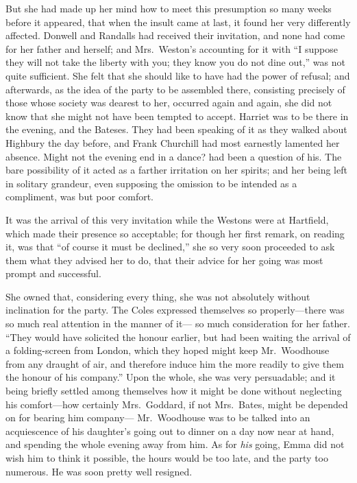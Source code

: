 But she had made up her mind how to meet this presumption so many
weeks before it appeared, that when the insult came at last,
it found her very differently affected.  Donwell and Randalls
had received their invitation, and none had come for her father
and herself; and Mrs.\ Weston's accounting for it with ``I suppose
they will not take the liberty with you; they know you do not
dine out,'' was not quite sufficient.  She felt that she should
like to have had the power of refusal; and afterwards, as the idea
of the party to be assembled there, consisting precisely of those
whose society was dearest to her, occurred again and again,
she did not know that she might not have been tempted to accept.
Harriet was to be there in the evening, and the Bateses.  They had
been speaking of it as they walked about Highbury the day before,
and Frank Churchill had most earnestly lamented her absence.
Might not the evening end in a dance? had been a question of his.
The bare possibility of it acted as a farther irritation on her spirits;
and her being left in solitary grandeur, even supposing the omission
to be intended as a compliment, was but poor comfort.

It was the arrival of this very invitation while the Westons were
at Hartfield, which made their presence so acceptable; for though her
first remark, on reading it, was that ``of course it must be declined,''
she so very soon proceeded to ask them what they advised her to do,
that their advice for her going was most prompt and successful.

She owned that, considering every thing, she was not absolutely
without inclination for the party.  The Coles expressed themselves
so properly---there was so much real attention in the manner of it---%
so much consideration for her father.  ``They would have solicited the
honour earlier, but had been waiting the arrival of a folding-screen
from London, which they hoped might keep Mr.\ Woodhouse from any draught
of air, and therefore induce him the more readily to give them the
honour of his company.''  Upon the whole, she was very persuadable;
and it being briefly settled among themselves how it might be
done without neglecting his comfort---how certainly Mrs.\ Goddard,
if not Mrs.\ Bates, might be depended on for bearing him company---%
Mr.\ Woodhouse was to be talked into an acquiescence of his daughter's
going out to dinner on a day now near at hand, and spending
the whole evening away from him.  As for \emph{his} going, Emma did
not wish him to think it possible, the hours would be too late,
and the party too numerous.  He was soon pretty well resigned.

